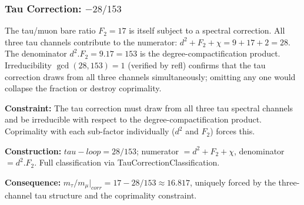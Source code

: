 \documentclass[11pt,a4paper]{book}
\def\cdot{.}%
\def\mathrm#1{#1}%
\def\texttt#1{#1}%
\begin{document}
\subsubsection*{Tau Correction: $-28/153$}

The tau/muon bare ratio $F_2 = 17$ is itself subject to a spectral correction.
All three tau channels contribute to the numerator: $d^2 + F_2 + \chi = 9 + 17 + 2 = 28$.
The denominator $d^2 \cdot F_2 = 9 \cdot 17 = 153$ is the degree-compactification
product.  Irreducibility $\gcd(28, 153) = 1$ (verified by \texttt{refl}) confirms
that the tau correction draws from all three channels simultaneously; omitting any
one would collapse the fraction or destroy coprimality.

\medskip
\noindent
\textbf{Constraint:}
The tau correction must draw from all three tau spectral channels and be irreducible
with respect to the degree-compactification product.  Coprimality with each sub-factor
individually ($d^2$ and $F_2$) forces this.

\noindent
\textbf{Construction:}
$\texttt{tau-loop} = 28/153$; numerator $= d^2 + F_2 + \chi$, denominator
$= d^2 \cdot F_2$.  Full classification via \texttt{TauCorrectionClassification}.

\noindent
\textbf{Consequence:}
$m_\tau / m_\mu|_{\mathrm{corr}} = 17 - 28/153 \approx 16.817$, uniquely forced
by the three-channel tau structure and the coprimality constraint.
\end{document}
